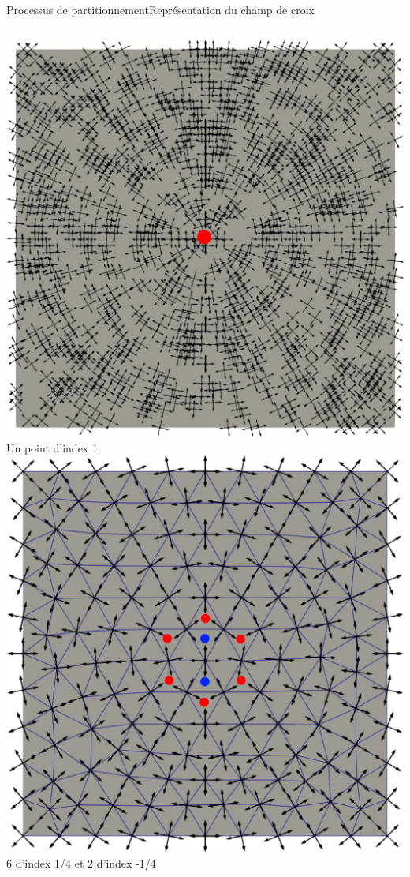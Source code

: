 \documentclass[compress,10pt,aspectratio=169]{beamer}
\begin{document}
\begin{frame}{Processus de partitionnement}{Représentation du champ de croix}
\begin{columns}
\begin{column}{0.2\textwidth}
\centering
\includegraphics[scale=0.09]{images/u_sing.pdf}
\scriptsize Un point d'index 1
\includegraphics[scale=0.09]{images/u_h_sing.pdf}
\scriptsize 6 d'index 1/4 et 2 d'index -1/4 \vspace{0.2cm}
\end{column}
\end{columns}
\end{frame}
\end{document}

